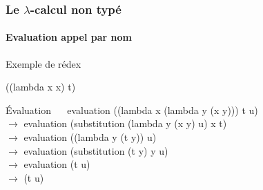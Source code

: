 \documentclass{beamer}
\begin{document}
\begin{frame}
\frametitle{Le $\lambda$-calcul non typé}
\framesubtitle{Evaluation appel par nom}

\begin{block}{Exemple de rédex}
  \begin{center}
  ((lambda x x) t) 
  \end{center}
\end{block}

\begin{block}{Évaluation}
    $\:\:\:\:\:\:$evaluation ((lambda x (lambda y (x y))) t u) \\
    $\rightarrow$ evaluation (substitution (lambda y (x y) u) x t) \\
    $\rightarrow$ evaluation ((lambda y (t y)) u) \\
    $\rightarrow$ evaluation (substitution (t y) y u) \\
    $\rightarrow$ evaluation (t u) \\
    $\rightarrow$ (t u)
\end{block}

\end{frame}
\end{document}

